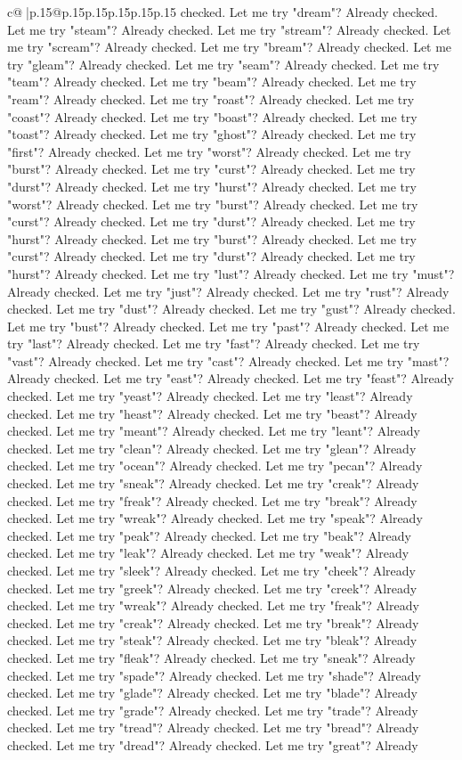 \documentclass{article}
\begin{document}
{\begin{supertabular}{c@{$\;$}|p{.15\linewidth}@{}p{.15\linewidth}p{.15\linewidth}p{.15\linewidth}p{.15\linewidth}p{.15\linewidth}}
{{{checked. Let me try "dream"? Already checked. Let me try "steam"? Already checked. Let me try "stream"? Already checked. Let me try "scream"? Already checked. Let me try "bream"? Already checked. Let me try "gleam"? Already checked. Let me try "seam"? Already checked. Let me try "team"? Already checked. Let me try "beam"? Already checked. Let me try "ream"? Already checked. Let me try "roast"? Already checked. Let me try "coast"? Already checked. Let me try "boast"? Already checked. Let me try "toast"? Already checked. Let me try "ghost"? Already checked. Let me try "first"? Already checked. Let me try "worst"? Already checked. Let me try "burst"? Already checked. Let me try "curst"? Already checked. Let me try "durst"? Already checked. Let me try "hurst"? Already checked. Let me try "worst"? Already checked. Let me try "burst"? Already checked. Let me try "curst"? Already checked. Let me try "durst"? Already checked. Let me try "hurst"? Already checked. Let me try "burst"? Already checked. Let me try "curst"? Already checked. Let me try "durst"? Already checked. Let me try "hurst"? Already checked. Let me try "lust"? Already checked. Let me try "must"? Already checked. Let me try "just"? Already checked. Let me try "rust"? Already checked. Let me try "dust"? Already checked. Let me try "gust"? Already checked. Let me try "bust"? Already checked. Let me try "past"? Already checked. Let me try "last"? Already checked. Let me try "fast"? Already checked. Let me try "vast"? Already checked. Let me try "cast"? Already checked. Let me try "mast"? Already checked. Let me try "east"? Already checked. Let me try "feast"? Already checked. Let me try "yeast"? Already checked. Let me try "least"? Already checked. Let me try "heast"? Already checked. Let me try "beast"? Already checked. Let me try "meant"? Already checked. Let me try "leant"? Already checked. Let me try "clean"? Already checked. Let me try "glean"? Already checked. Let me try "ocean"? Already checked. Let me try "pecan"? Already checked. Let me try "sneak"? Already checked. Let me try "creak"? Already checked. Let me try "freak"? Already checked. Let me try "break"? Already checked. Let me try "wreak"? Already checked. Let me try "speak"? Already checked. Let me try "peak"? Already checked. Let me try "beak"? Already checked. Let me try "leak"? Already checked. Let me try "weak"? Already checked. Let me try "sleek"? Already checked. Let me try "cheek"? Already checked. Let me try "greek"? Already checked. Let me try "creek"? Already checked. Let me try "wreak"? Already checked. Let me try "freak"? Already checked. Let me try "creak"? Already checked. Let me try "break"? Already checked. Let me try "steak"? Already checked. Let me try "bleak"? Already checked. Let me try "fleak"? Already checked. Let me try "sneak"? Already checked. Let me try "spade"? Already checked. Let me try "shade"? Already checked. Let me try "glade"? Already checked. Let me try "blade"? Already checked. Let me try "grade"? Already checked. Let me try "trade"? Already checked. Let me try "tread"? Already checked. Let me try "bread"? Already checked. Let me try "dread"? Already checked. Let me try "great"? Already }}}
\end{supertabular}}
\end{document}

